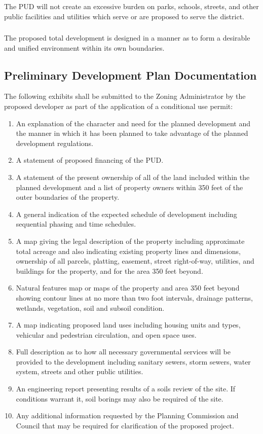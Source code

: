 \subsubsection{}
The PUD will not create an excessive burden on parks, schools, streets, and other public facilities and utilities which serve or are proposed to serve the district.
\subsubsection{}
The proposed total development is designed in a manner as to form a desirable and unified environment within its own boundaries.
\subsection{Preliminary Development Plan Documentation}
The following exhibits shall be submitted to the Zoning Administrator by the proposed developer as part of the application of a conditional use permit:
\begin{enumerate}[{\indent}1)]
    \item An explanation of the character and need for the planned development and the manner in which it has been planned to take advantage of the planned development regulations.
    \item A statement of proposed financing of the PUD.
    \item A statement of the present ownership of all of the land included within the planned development and a list of property owners within 350 feet of the outer boundaries of the property.
    \item A general indication of the expected schedule of development including sequential phasing and time schedules.
    \item A map giving the legal description of the property including approximate total acreage and also indicating existing property lines and dimensions, ownership of all parcels, platting, easement, street right-of-way, utilities, and buildings for the property, and for the area 350 feet beyond.
    \item Natural features map or maps of the property and area 350 feet beyond showing contour lines at no more than two foot intervals, drainage patterns, wetlands, vegetation, soil and subsoil condition.
    \item A map indicating proposed land uses including housing units and types, vehicular and pedestrian circulation, and open space uses.
    \item Full description as to how all necessary governmental services will be provided to the development including sanitary sewers, storm sewers, water system, streets and other public utilities.
    \item An engineering report presenting results of a soils review of the site.  If conditions warrant it, soil borings may also be required of the site.
    \item Any additional information requested by the Planning Commission and Council that may be required for clarification of the proposed project.
\end{enumerate}
